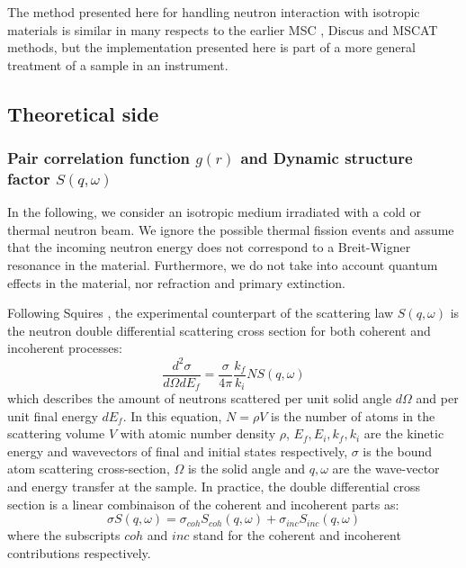 The method presented here for handling neutron interaction with isotropic materials is similar in many respects to the earlier MSC \cite{msc}, Discus \cite{discus} and MSCAT \cite{mscat} methods, but the implementation presented here is part of a more general treatment of a sample in an instrument.

\subsection{Theoretical side}

\subsubsection{Pair correlation function $g(r)$ and Dynamic structure factor $S(q,\omega)$}

In the following, we consider an isotropic medium irradiated with a cold or thermal neutron beam. We ignore the possible thermal fission events and assume that the incoming neutron energy does not correspond to a Breit-Wigner resonance in the material. Furthermore, we do not take into account quantum effects in the material, nor refraction and primary extinction.

Following Squires \cite{squires}, the experimental counterpart of the scattering law $S(q,\omega)$ is the neutron double differential scattering cross section for both coherent and incoherent processes:
\begin{equation}\label{eq:d2sigma}
\frac{d^2\sigma}{d\Omega dE_f} = \frac{\sigma}{4\pi}\frac{k_f}{k_i} N S(q, \omega)
\end{equation}
which describes the amount of neutrons scattered per unit solid angle $d\Omega$ and per unit final energy $dE_f$. In this equation, $N=\rho V$ is the number of atoms in the scattering volume $V$ with atomic number density $\rho$, $E_f, E_i, k_f, k_i$ are the kinetic energy and wavevectors of final and initial states respectively, $\sigma$ is the bound atom scattering cross-section, $\Omega$ is the solid angle and $q,\omega$ are the wave-vector and energy transfer at the sample. In practice, the double differential cross section is a linear combinaison of the coherent and incoherent parts as:
\begin{equation}
\label{eq:S=coh+inc}
\sigma S(q,\omega) = \sigma_{coh} S_{coh}(q,\omega) + \sigma_{inc} S_{inc}(q,\omega)
\end{equation}
where the subscripts $coh$ and $inc$ stand for the coherent and incoherent contributions respectively.

